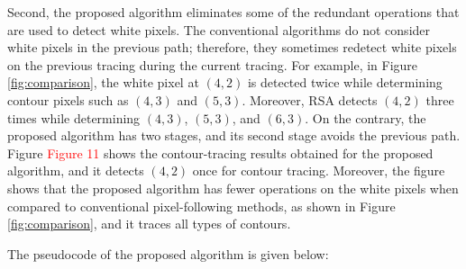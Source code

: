 
Second, the proposed algorithm eliminates some of the redundant operations that are used to detect white pixels. The conventional algorithms do not consider white pixels in the previous path; therefore, they sometimes redetect white pixels on the previous tracing during the current tracing. For example, in Figure \ref{fig:comparison}, the white pixel at $(4, 2)$ is detected twice while determining contour pixels such as $(4, 3)$ and $(5, 3)$. Moreover, RSA detects $(4, 2)$ three times while determining $(4, 3)$, $(5, 3)$, and $(6, 3)$. On the contrary, the proposed algorithm has two stages, and its second stage avoids the previous path. Figure \textcolor{red}{Figure 11} shows the contour-tracing results obtained for the proposed algorithm, and it detects $(4, 2)$ once for contour tracing. Moreover, the figure shows that the proposed algorithm has fewer operations on the white pixels when compared to conventional pixel-following methods, as shown in Figure \ref{fig:comparison}, and it traces all types of contours. 


The pseudocode of the proposed algorithm is given below: 

